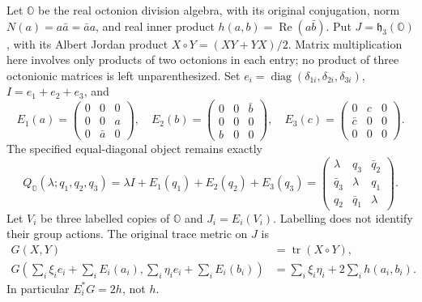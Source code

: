 \documentclass[11pt]{article}
\theoremstyle{definition}
\begin{document}
Let $\mathbb O$ be the real octonion division algebra, with its original
conjugation, norm $N(a)=a\bar a=\bar a a$, and real inner product
$h(a,b)=\operatorname{Re}(a\bar b)$. Put $J=\mathfrak h_3(\mathbb O)$,
with its Albert Jordan product $X\circ Y=(XY+YX)/2$. Matrix multiplication
here involves only products of two octonions in each entry; no product
of three octonionic matrices is left unparenthesized. Set
$e_i=\operatorname{diag}(\delta_{1i},\delta_{2i},\delta_{3i})$,
$I=e_1+e_2+e_3$, and
\[
 E_1(a)=\begin{pmatrix}0&0&0\\0&0&a\\0&\bar a&0\end{pmatrix},\quad
 E_2(b)=\begin{pmatrix}0&0&\bar b\\0&0&0\\b&0&0\end{pmatrix},\quad
 E_3(c)=\begin{pmatrix}0&c&0\\\bar c&0&0\\0&0&0\end{pmatrix}.
\]
The specified equal-diagonal object remains exactly
\begin{equation}
 Q_{\mathbb O}(\lambda;q_1,q_2,q_3)
 =\lambda I+E_1(q_1)+E_2(q_2)+E_3(q_3)
 =\begin{pmatrix}\lambda&q_3&\bar q_2\\
 \bar q_3&\lambda&q_1\\q_2&\bar q_1&\lambda\end{pmatrix}.
 \label{att:eq:Q}
\end{equation}
Let $V_i$ be three labelled copies of $\mathbb O$ and $J_i=E_i(V_i)$.
Labelling does not identify their group actions. The original trace
metric on $J$ is
\begin{equation}
\begin{split}
 G(X,Y)&=\operatorname{tr}(X\circ Y),\\
 G\left(\sum_i\xi_i e_i+\sum_iE_i(a_i),
        \sum_i\eta_i e_i+\sum_iE_i(b_i)\right)
 &=\sum_i\xi_i\eta_i+2\sum_i h(a_i,b_i).
\end{split}
\label{att:eq:metrics}
\end{equation}
In particular $E_i^*G=2h$, not $h$.
\end{document}

